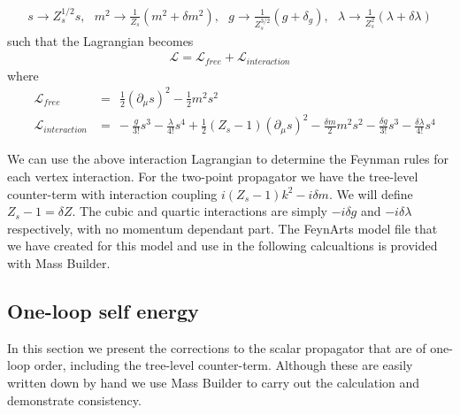 \documentclass[11pt]{article}
\newcommand{\mb}{\textsf{Mass Builder} }
\newcommand{\mbs}{\textsf{Mass Builder}}
\newcommand{\feynarts}{\textsf{FeynArts} }
\begin{document}
\begin{align}
s\rightarrow Z^{1/2}_ss, \ \ \ m^2\rightarrow\frac{1}{Z_s}(m^2+\delta m^2),  \ \ \ g\rightarrow \frac{1}{Z_s^{3/2}}(g+\delta_g), \ \ \ \lambda\rightarrow \frac{1}{Z_s^2}(\lambda+\delta\lambda)
\end{align}
such that the Lagrangian becomes
\begin{align}
\mathcal{L} = \mathcal{L}_{free}+\mathcal{L}_{interaction}
\end{align}
where
\begin{eqnarray}
&\mathcal{L}_{free} &=  \ \ \frac{1}{2}(\partial_{\mu} s)^2-\frac{1}{2}m^2s^2\\
&\mathcal{L}_{interaction} &= \ -\frac{g}{3!}s^3-\frac{\lambda}{4!}s^4  +\frac{1}{2}(Z_s-1)(\partial_{\mu} s)^2 -\frac{\delta m}{2}m^2s^2-\frac{\delta g}{3!}s^3-\frac{\delta \lambda}{4!}s^4
\end{eqnarray}

We can use the above interaction Lagrangian to determine the Feynman rules for each vertex interaction.  For the two-point propagator we have the tree-level counter-term with interaction coupling $i(Z_s-1)k^2-i\delta m$.  We will define $Z_s-1=\delta Z$.  The cubic and quartic interactions are simply $-i\delta g$ and $-i\delta \lambda$ respectively, with no momentum dependant part.  The \feynarts model file that we have created for this model and use in the following calcualtions is provided with \mbs.



\subsection{One-loop self energy}\label{sec:scalar_one_loop}

In this section we present the corrections to the scalar propagator that are of one-loop order, including the tree-level counter-term.  Although these are easily written down by hand we use \mb to carry out the calculation and demonstrate consistency.\\
\end{document}
